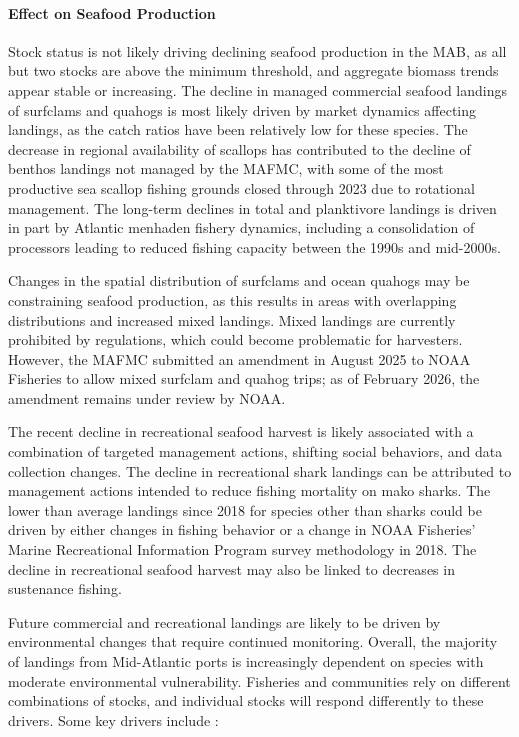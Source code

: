 \documentclass[
  10pt,
]{article}
\begin{document}
\paragraph{Effect on Seafood
Production}\label{effect-on-seafood-production}

Stock status is not likely driving declining seafood production in the
MAB, as all but two stocks are above the minimum threshold, and
aggregate biomass trends appear stable or increasing. The decline in
managed commercial seafood landings of surfclams and quahogs is most
likely driven by market dynamics affecting landings, as the catch ratios
have been relatively low for these species. The decrease in regional
availability of scallops has contributed to the decline of benthos
landings not managed by the MAFMC, with some of the most productive sea
scallop fishing grounds closed through 2023 due to rotational
management. The long-term declines in total and planktivore landings is
driven in part by Atlantic menhaden fishery dynamics, including a
consolidation of processors leading to reduced fishing capacity between
the 1990s and mid-2000s.

Changes in the spatial distribution of surfclams and ocean quahogs may
be constraining seafood production, as this results in areas with
overlapping distributions and increased mixed landings. Mixed landings
are currently prohibited by regulations, which could become problematic
for harvesters. However, the MAFMC submitted an amendment in August 2025
to NOAA Fisheries to allow mixed surfclam and quahog trips; as of
February 2026, the amendment remains under review by NOAA.

The recent decline in recreational seafood harvest is likely associated
with a combination of targeted management actions, shifting social
behaviors, and data collection changes. The decline in recreational
shark landings can be attributed to management actions intended to
reduce fishing mortality on mako sharks. The lower than average landings
since 2018 for species other than sharks could be driven by either
changes in fishing behavior or a change in NOAA Fisheries' Marine
Recreational Information Program survey methodology in 2018. The decline
in recreational seafood harvest may also be linked to decreases in
sustenance fishing.

Future commercial and recreational landings are likely to be driven by
environmental changes that require continued monitoring. Overall, the
majority of landings from Mid-Atlantic ports is increasingly dependent
on species with moderate environmental vulnerability. Fisheries and
communities rely on different combinations of stocks, and individual
stocks will respond differently to these drivers. Some key drivers
include :
\end{document}
